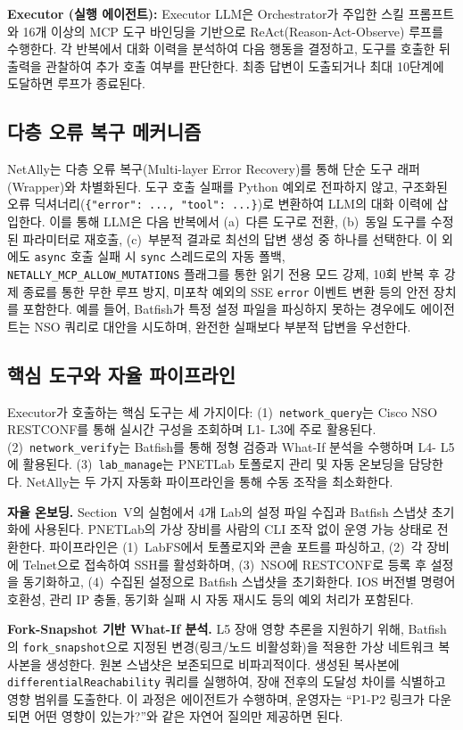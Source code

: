 \textbf{Executor (실행 에이전트):} Executor LLM은 Orchestrator가 주입한 스킬 프롬프트와 16개 이상의 MCP 도구 바인딩을 기반으로 ReAct(Reason-Act-Observe) 루프를 수행한다. 각 반복에서 대화 이력을 분석하여 다음 행동을 결정하고, 도구를 호출한 뒤 출력을 관찰하여 추가 호출 여부를 판단한다. 최종 답변이 도출되거나 최대 10단계에 도달하면 루프가 종료된다.


\subsection{다층 오류 복구 메커니즘}
NetAlly는 다층 오류 복구(Multi-layer Error Recovery)를 통해 단순 도구 래퍼(Wrapper)와 차별화된다. 도구 호출 실패를 Python 예외로 전파하지 않고, 구조화된 오류 딕셔너리(\texttt{\{"error": ..., "tool": ...\}})로 변환하여 LLM의 대화 이력에 삽입한다. 이를 통해 LLM은 다음 반복에서 (a)~다른 도구로 전환, (b)~동일 도구를 수정된 파라미터로 재호출, (c)~부분적 결과로 최선의 답변 생성 중 하나를 선택한다. 이 외에도 \texttt{async} 호출 실패 시 \texttt{sync} 스레드로의 자동 폴백, \texttt{NETALLY\_MCP\_ALLOW\_MUTATIONS} 플래그를 통한 읽기 전용 모드 강제, 10회 반복 후 강제 종료를 통한 무한 루프 방지, 미포착 예외의 SSE \texttt{error} 이벤트 변환 등의 안전 장치를 포함한다. 예를 들어, Batfish가 특정 설정 파일을 파싱하지 못하는 경우에도 에이전트는 NSO 쿼리로 대안을 시도하며, 완전한 실패보다 부분적 답변을 우선한다.

\subsection{핵심 도구와 자율 파이프라인}
Executor가 호출하는 핵심 도구는 세 가지이다: (1)~\texttt{network\_query}는 Cisco NSO RESTCONF를 통해 실시간 구성을 조회하며 L1- L3에 주로 활용된다. (2)~\texttt{network\_verify}는 Batfish를 통해 정형 검증과 What-If 분석을 수행하며 L4- L5에 활용된다. (3)~\texttt{lab\_manage}는 PNETLab 토폴로지 관리 및 자동 온보딩을 담당한다.
NetAlly는 두 가지 자동화 파이프라인을 통해 수동 조작을 최소화한다.

\textbf{자율 온보딩.} Section~V의 실험에서 4개 Lab의 설정 파일 수집과 Batfish 스냅샷 초기화에 사용된다. PNETLab의 가상 장비를 사람의 CLI 조작 없이 운영 가능 상태로 전환한다. 파이프라인은 (1)~LabFS에서 토폴로지와 콘솔 포트를 파싱하고, (2)~각 장비에 Telnet으로 접속하여 SSH를 활성화하며, (3)~NSO에 RESTCONF로 등록 후 설정을 동기화하고, (4)~수집된 설정으로 Batfish 스냅샷을 초기화한다. IOS 버전별 명령어 호환성, 관리 IP 충돌, 동기화 실패 시 자동 재시도 등의 예외 처리가 포함된다.

\textbf{Fork-Snapshot 기반 What-If 분석.} L5 장애 영향 추론을 지원하기 위해, Batfish의 \texttt{fork\_snapshot}으로 지정된 변경(링크/노드 비활성화)을 적용한 가상 네트워크 복사본을 생성한다. 원본 스냅샷은 보존되므로 비파괴적이다. 생성된 복사본에 \texttt{differentialReachability} 쿼리를 실행하여, 장애 전후의 도달성 차이를 식별하고 영향 범위를 도출한다. 이 과정은 에이전트가 수행하며, 운영자는 ``P1-P2 링크가 다운되면 어떤 영향이 있는가?''와 같은 자연어 질의만 제공하면 된다.